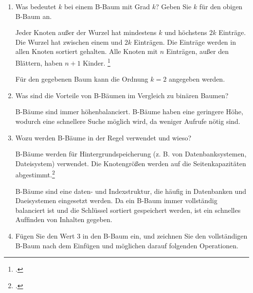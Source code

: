 \documentclass{lehramt-informatik-aufgabe}
\begin{document}
\begin{enumerate}


\item Was bedeutet $k$ bei einem B-Baum mit Grad $k$? Geben Sie $k$ für
den obigen B-Baum an.

\begin{liAntwort}
Jeder Knoten außer der Wurzel hat mindestens $k$ und höchstens $2k$
Einträge. Die Wurzel hat zwischen einem und $2k$ Einträgen. Die Einträge
werden in allen Knoten sortiert gehalten. Alle Knoten mit $n$ Einträgen,
außer den Blättern, haben $n + 1$ Kinder.
\footcite[Seite 225]{kemper}

Für den gegebenen Baum kann die Ordnung $k = 2$ angegeben werden.
\end{liAntwort}


\item Was sind die Vorteile von B-Bäumen im Vergleich zu binären Baumen?

\begin{liAntwort}
B-Bäume sind immer höhenbalanciert. B-Bäume haben eine geringere Höhe,
wodurch eine schnellere Suche möglich wird, da weniger Aufrufe nötig
sind.
\end{liAntwort}


\item Wozu werden B-Bäume in der Regel verwendet und wieso?

\begin{liAntwort}
B-Bäume werden für Hintergrundspeicherung (z. B. von Datenbanksystemen,
Dateisystem) verwendet. Die Knotengrößen werden auf die
Seitenkapazitäten abgestimmt.\footcite[Seite 223]{kemper}

B-Bäume sind eine daten- und Indexstruktur, die häuﬁg in Datenbanken und
Daeisystemen eingesetzt werden. Da ein B-Baum immer vollständig
balanciert ist und die Schlüssel sortiert gespeichert werden, ist ein
schnelles Aufﬁnden von Inhalten gegeben.
\end{liAntwort}


\item Fügen Sie den Wert $3$ in den B-Baum ein, und zeichnen Sie den
vollständigen B-Baum nach dem Einfügen und möglichen darauf folgenden
Operationen.


\end{enumerate}
\end{document}
